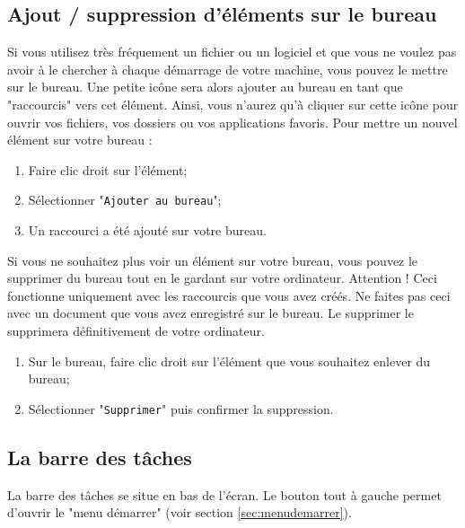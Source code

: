 \documentclass[12pt]{book}
\begin{document}
		\subsection{Ajout / suppression d'éléments sur le bureau}
			Si vous utilisez très fréquement un fichier ou un logiciel et que vous ne voulez pas avoir à le chercher à chaque démarrage de votre machine, vous pouvez le mettre sur le bureau. Une petite icône sera alors ajouter au bureau en tant que "raccourcis" vers cet élément. 
			Ainsi, vous n'aurez qu'à cliquer sur cette icône pour ouvrir vos fichiers, vos dossiers ou vos applications favoris.\newline
			Pour mettre un nouvel élément sur votre bureau :
			\begin{enumerate}
				\item Faire clic droit sur l'élément;
				\item Sélectionner "\texttt{Ajouter au bureau}";
				\item Un raccourci a été ajouté sur votre bureau.
			\end{enumerate}
			Si vous ne souhaitez plus voir un élément sur votre bureau, vous pouvez le supprimer du bureau tout en le gardant sur votre ordinateur.\newline
			Attention ! Ceci fonctionne uniquement avec les raccourcis que vous avez créés. Ne faites pas ceci avec un document que vous avez enregistré sur le bureau.
			Le supprimer le supprimera définitivement de votre ordinateur.
			\begin{enumerate}
				\item Sur le bureau, faire clic droit sur l'élément que vous souhaitez enlever du bureau;
				\item Sélectionner "\texttt{Supprimer}" puis confirmer la suppression.
			\end{enumerate}
	\subsection{La barre des tâches}
		La barre des tâches se situe en bas de l'écran.
		Le bouton tout à gauche permet d'ouvrir le "menu démarrer" (voir section \ref{sec:menudemarrer}). 
\end{document}
